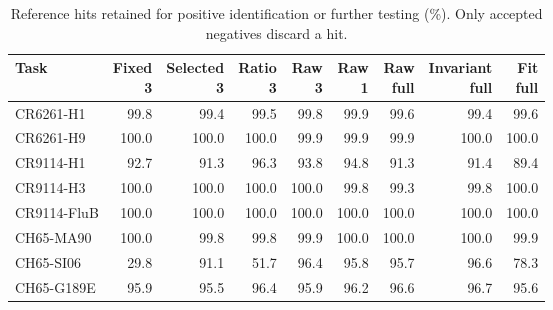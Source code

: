 \begin{table}[t]
\centering\footnotesize
\caption{Reference hits retained for positive identification or further testing (\%). Only accepted negatives discard a hit.}
\setlength{\tabcolsep}{4pt}
\begin{tabular}{lrrrrrrrr}
\toprule
Task & \shortstack{Fixed\\3} & \shortstack{Selected\\3} & \shortstack{Ratio\\3} & \shortstack{Raw\\3} & \shortstack{Raw\\1} & \shortstack{Raw\\full} & \shortstack{Invariant\\full} & \shortstack{Fit\\full} \\
\midrule
CR6261-H1 & 99.8 & 99.4 & 99.5 & 99.8 & 99.9 & 99.6 & 99.4 & 99.6 \\
CR6261-H9 & 100.0 & 100.0 & 100.0 & 99.9 & 99.9 & 99.9 & 100.0 & 100.0 \\
CR9114-H1 & 92.7 & 91.3 & 96.3 & 93.8 & 94.8 & 91.3 & 91.4 & 89.4 \\
CR9114-H3 & 100.0 & 100.0 & 100.0 & 100.0 & 99.8 & 99.3 & 99.8 & 100.0 \\
CR9114-FluB & 100.0 & 100.0 & 100.0 & 100.0 & 100.0 & 100.0 & 100.0 & 100.0 \\
CH65-MA90 & 100.0 & 99.8 & 99.8 & 99.9 & 100.0 & 100.0 & 100.0 & 99.9 \\
CH65-SI06 & 29.8 & 91.1 & 51.7 & 96.4 & 95.8 & 95.7 & 96.6 & 78.3 \\
CH65-G189E & 95.9 & 95.5 & 96.4 & 95.9 & 96.2 & 96.6 & 96.7 & 95.6 \\
\bottomrule
\end{tabular}
\end{table}
